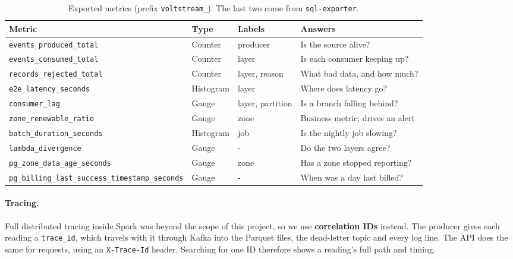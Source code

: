 \documentclass[11pt,a4paper]{article}
\begin{document}
\begin{table}[!htbp]
\centering
\caption{Exported metrics (prefix \texttt{voltstream\_}). The last two come from
\texttt{sql-exporter}.}
\label{tab:metrics}
\small
\begin{tabularx}{\textwidth}{L{5.6cm} L{1.5cm} L{2.2cm} X}
\toprule
\textbf{Metric} & \textbf{Type} & \textbf{Labels} & \textbf{Answers} \\
\midrule
\texttt{events\_produced\_total} & Counter & producer & Is the source alive? \\
\texttt{events\_consumed\_total} & Counter & layer & Is each consumer keeping up? \\
\texttt{records\_rejected\_total} & Counter & layer, reason & What bad data, and how much? \\
\texttt{e2e\_latency\_seconds} & Histogram & layer & Where does latency go? \\
\texttt{consumer\_lag} & Gauge & layer, partition & Is a branch falling behind? \\
\texttt{zone\_renewable\_ratio} & Gauge & zone & Business metric; drives an alert \\
\texttt{batch\_duration\_seconds} & Histogram & job & Is the nightly job slowing? \\
\texttt{lambda\_divergence} & Gauge & - & Do the two layers agree? \\
\texttt{pg\_zone\_data\_age\_seconds} & Gauge & zone & Has a zone stopped reporting? \\
\texttt{pg\_billing\_last\_success\_timestamp\_seconds} & Gauge & - & When was a day last billed? \\
\bottomrule
\end{tabularx}
\end{table}

\paragraph{Tracing.} Full distributed tracing inside Spark was beyond the scope of this
project, so we use \textbf{correlation IDs} instead. The producer gives each reading a
\texttt{trace\_id}, which travels with it through Kafka into the Parquet files, the
dead-letter topic and every log line. The API does the same for requests, using an
\texttt{X-Trace-Id} header. Searching for one ID therefore shows a reading's full path and
timing.
\end{document}
